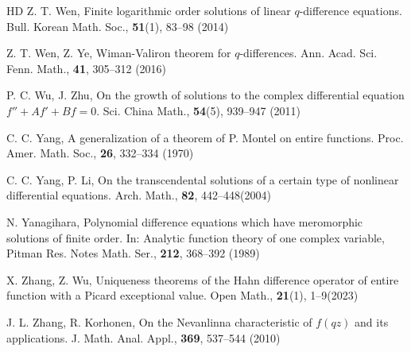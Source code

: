 \documentclass[sn-mathphys-num]{sn-jnl}%
\theoremstyle{thmstyleone}%
\theoremstyle{thmstyletwo}%
\theoremstyle{thmstylethree}%
\begin{document}
\begin{thebibliography}{HD}
 Z. T. Wen, Finite logarithmic order solutions of linear $q$-difference equations. Bull. Korean Math. Soc., \textbf{51}(1), 83--98 (2014)

 Z. T. Wen, Z. Ye, Wiman-Valiron theorem for \(q\)-differences. Ann. Acad. Sci. Fenn. Math., \textbf{41}, 305--312 (2016)

 P. C. Wu, J. Zhu, On the growth of solutions to the complex differential equation $f''+Af'+Bf=0$. Sci. China Math., \textbf{54}(5), 939--947 (2011)

 C. C. Yang, A generalization of a theorem of P. Montel on entire functions. Proc. Amer. Math. Soc., \textbf{26}, 332--334 (1970)

 C. C. Yang, P. Li, On the transcendental solutions of a certain type of nonlinear differential equations. Arch. Math., \textbf{82}, 442--448(2004)

 N. Yanagihara, Polynomial difference equations which have meromorphic solutions of finite order. In: Analytic function theory of one complex variable, Pitman Res. Notes Math. Ser., \textbf{212}, 368--392 (1989)

 X. Zhang, Z. Wu, Uniqueness theorems of the Hahn difference operator of entire function with a Picard exceptional value. Open Math., \textbf{21}(1), 1--9(2023)

 J. L. Zhang, R. Korhonen, On the Nevanlinna characteristic of \(f(qz)\) and its applications. J. Math. Anal. Appl., \textbf{369}, 537--544 (2010)
	
\end{thebibliography}
\end{document}
